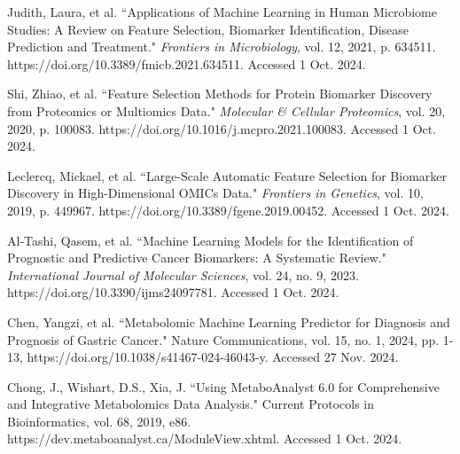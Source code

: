 \documentclass[a4paper,12pt]{article}
\begin{document}
\newpage
\begin{thebibliography}{5}

	Judith, Laura, et al. ``Applications of Machine Learning in Human Microbiome Studies: A Review on Feature Selection, Biomarker Identification, Disease Prediction and Treatment." \textit{Frontiers in Microbiology}, vol. 12, 2021, p. 634511. https://doi.org/10.3389/fmicb.2021.634511. Accessed 1 Oct. 2024.

	Shi, Zhiao, et al. ``Feature Selection Methods for Protein Biomarker Discovery from Proteomics or Multiomics Data." \textit{Molecular \& Cellular Proteomics}, vol. 20, 2020, p. 100083. https://doi.org/10.1016/j.mcpro.2021.100083. Accessed 1 Oct. 2024.

	Leclercq, Mickael, et al. ``Large-Scale Automatic Feature Selection for Biomarker Discovery in High-Dimensional OMICs Data." \textit{Frontiers in Genetics}, vol. 10, 2019, p. 449967. https://doi.org/10.3389/fgene.2019.00452. Accessed 1 Oct. 2024.

	Al-Tashi, Qasem, et al. ``Machine Learning Models for the Identification of Prognostic and Predictive Cancer Biomarkers: A Systematic Review." \textit{International Journal of Molecular Sciences}, vol. 24, no. 9, 2023. https://doi.org/10.3390/ijms24097781. Accessed 1 Oct. 2024.

	Chen, Yangzi, et al. ``Metabolomic Machine Learning Predictor for Diagnosis and Prognosis of Gastric Cancer." Nature Communications, vol. 15, no. 1, 2024, pp. 1-13,  https://doi.org/10.1038/s41467-024-46043-y. Accessed 27 Nov. 2024.

	Chong, J., Wishart, D.S., Xia, J. ``Using MetaboAnalyst 6.0 for Comprehensive and Integrative Metabolomics Data Analysis." Current Protocols in Bioinformatics, vol. 68, 2019, e86. https://dev.metaboanalyst.ca/ModuleView.xhtml. Accessed 1 Oct. 2024.

\end{thebibliography}
\end{document}
